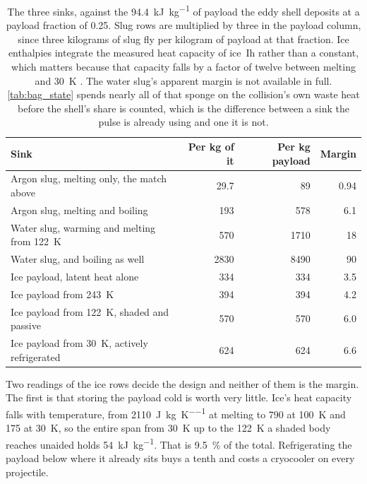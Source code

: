 \documentclass{article}
\begin{document}
\begin{table}[!htpb]
    \centering
    \caption{The three sinks, against the \SI{94.4}{\kilo\joule\per\kilogram} of payload the eddy shell deposits at a payload fraction of \num{0.25}. Slug rows are multiplied by three in the payload column, since three kilograms of slug fly per kilogram of payload at that fraction. Ice enthalpies integrate the measured heat capacity of ice~Ih rather than a constant, which matters because that capacity falls by a factor of twelve between melting and \SI{30}{\kelvin} \cite{crc_handbook}. The water slug's apparent margin is not available in full. \autoref{tab:bag_state} spends nearly all of that sponge on the collision's own waste heat before the shell's share is counted, which is the difference between a sink the pulse is already using and one it is not.}
    \label{tab:payload_sink}
    \begin{tabular}{|l|r|r|r|}\hline
        \textbf{Sink} & \textbf{Per \si{\kilogram} of it} & \textbf{Per \si{\kilogram} payload} & \textbf{Margin} \\\hline
        Argon slug, melting only, the match above & 29.7 & 89 & \num{0.94} \\\hline
        Argon slug, melting and boiling & 193 & 578 & \num{6.1} \\\hline
        Water slug, warming and melting from \SI{122}{\kelvin} & 570 & 1710 & \num{18} \\\hline
        Water slug, and boiling as well & 2830 & 8490 & \num{90} \\\hline
        Ice payload, latent heat alone & 334 & 334 & \num{3.5} \\\hline
        Ice payload from \SI{243}{\kelvin} & 394 & 394 & \num{4.2} \\\hline
        Ice payload from \SI{122}{\kelvin}, shaded and passive & 570 & 570 & \num{6.0} \\\hline
        Ice payload from \SI{30}{\kelvin}, actively refrigerated & 624 & 624 & \num{6.6} \\\hline
    \end{tabular}
\end{table}

Two readings of the ice rows decide the design and neither of them is the margin. The first is that storing the payload cold is worth very little. Ice's heat capacity falls with temperature, from \SI{2110}{\joule\per\kilogram\per\kelvin} at melting to \SI{790}{} at \SI{100}{\kelvin} and \SI{175}{} at \SI{30}{\kelvin}, so the entire span from \SI{30}{\kelvin} up to the \SI{122}{\kelvin} a shaded body reaches unaided holds \SI{54}{\kilo\joule\per\kilogram}. That is \SI{9.5}{\percent} of the total. Refrigerating the payload below where it already sits buys a tenth and costs a cryocooler on every projectile.
\end{document}
